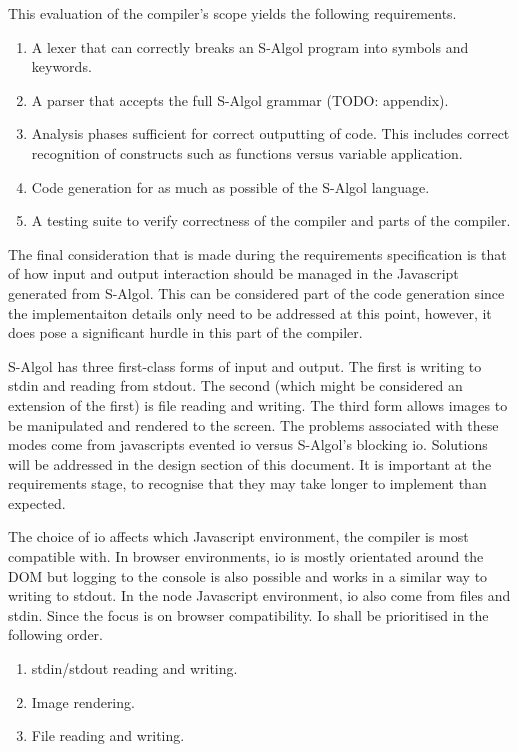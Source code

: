 \documentclass{article}
\begin{document}
This evaluation of the compiler's scope yields the following requirements.

\begin{enumerate}
\item A lexer that can correctly breaks an S-Algol program into symbols and keywords.
\item A parser that accepts the full S-Algol grammar (TODO: appendix).
\item Analysis phases sufficient for correct outputting of code. This includes correct recognition of constructs such as functions versus variable application.
\item Code generation for as much as possible of the S-Algol language.
\item A testing suite to verify correctness of the compiler and parts of the compiler.
\end{enumerate}

The final consideration that is made during the requirements specification is that of how input and output interaction should be managed in the Javascript generated from S-Algol. This can be considered part of the code generation since the implementaiton details only need to be addressed at this point, however, it does pose a significant hurdle in this part of the compiler.

S-Algol has three first-class forms of input and output. The first is writing to stdin and reading from stdout. The second (which might be considered an extension of the first) is file reading and writing. The third form allows images to be manipulated and rendered to the screen. The problems associated with these modes come from javascripts evented io versus S-Algol's blocking io. Solutions will be addressed in the design section of this document. It is important at the requirements stage, to recognise that they may take longer to implement than expected.

The choice of io affects which Javascript environment, the compiler is most compatible with. In browser environments, io is mostly orientated around the DOM but logging to the console is also possible and works in a similar way to writing to stdout. In the node Javascript environment, io also come from files and stdin. Since the focus is on browser compatibility. Io shall be prioritised in the following order.

\begin{enumerate}
\item stdin/stdout reading and writing.
\item Image rendering.
\item File reading and writing.
\end{enumerate}
\end{document}
